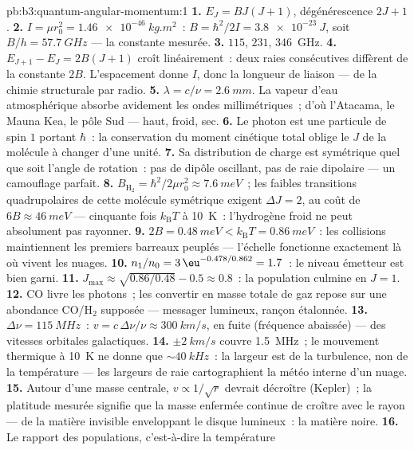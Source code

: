 \begin{solution}{pb:b3:quantum-angular-momentum:1}
\textbf{1.} $E_J = BJ(J+1)$, dégénérescence $2J + 1$.
\textbf{2.} $I = \mu r_0^2 = \qty{1.46e-46}{kg.m^2}$~: $B =
\hbar^2/2I = \qty{3.8e-23}{J}$, soit $B/h = \qty{57.7}{GHz}$ ---
la constante mesurée.
\textbf{3.} $115$, $231$, \qty{346}{GHz}.
\textbf{4.} $E_{J+1} - E_J = 2B(J+1)$ croît linéairement~: deux raies
consécutives diffèrent de la constante $2B$. L'espacement donne $I$,
donc la longueur de liaison --- de la chimie structurale par radio.
\textbf{5.} $\lambda = c/\nu = \qty{2.6}{mm}$. La vapeur d'eau
atmosphérique absorbe avidement les ondes millimétriques~; d'où
l'Atacama, le Mauna Kea, le pôle Sud --- haut, froid, sec.
\textbf{6.} Le photon est une particule de spin $1$ portant $\hbar$~:
la conservation du moment cinétique total oblige le $J$ de la molécule
à changer d'une unité.
\textbf{7.} Sa distribution de charge est symétrique quel que soit
l'angle de rotation~: pas de dipôle oscillant, pas de raie dipolaire
--- un camouflage parfait.
\textbf{8.} $B_{\text{H}_2} = \hbar^2/2\mu r_0^2 \approx
\qty{7.6}{meV}$~; les faibles transitions quadrupolaires de cette
molécule symétrique exigent $\Delta J = 2$, au coût de $6B \approx
\qty{46}{meV}$ --- cinquante fois $k_{\text{B}}T$ à \qty{10}{K}~:
l'hydrogène froid ne peut absolument pas rayonner.
\textbf{9.} $2B = \qty{0.48}{meV} < k_{\text{B}}T = \qty{0.86}{meV}$~:
les collisions maintiennent les premiers barreaux peuplés ---
l'échelle fonctionne exactement là où vivent les nuages.
\textbf{10.} $n_1/n_0 = 3\,\eu^{-0.478/0.862} = 1.7$~: le niveau
émetteur est bien garni.
\textbf{11.} $J_{\max} \approx \sqrt{0.86/0.48} - 0.5 \approx 0.8$~:
la population culmine en $J = 1$.
\textbf{12.} CO livre les photons~; les convertir en masse totale de
gaz repose sur une abondance CO/H$_2$ supposée --- messager lumineux,
rançon étalonnée.
\textbf{13.} $\Delta\nu = \qty{115}{MHz}$~: $v = c\,\Delta\nu/\nu
\approx \qty{300}{km/s}$, en fuite (fréquence abaissée) --- des
vitesses orbitales galactiques.
\textbf{14.} $\pm\qty{2}{km/s}$ couvre \qty{1.5}{MHz}~; le mouvement
thermique à \qty{10}{K} ne donne que $\sim\qty{40}{kHz}$~: la largeur
est de la turbulence, non de la température --- les largeurs de raie
cartographient la météo interne d'un nuage.
\textbf{15.} Autour d'une masse centrale, $v \propto 1/\sqrt r$
devrait décroître (Kepler)~; la platitude mesurée signifie que la
masse enfermée continue de croître avec le rayon --- de la matière
invisible enveloppant le disque lumineux~: la matière noire.
\textbf{16.} Le rapport des populations, c'est-à-dire la température

\end{solution}

